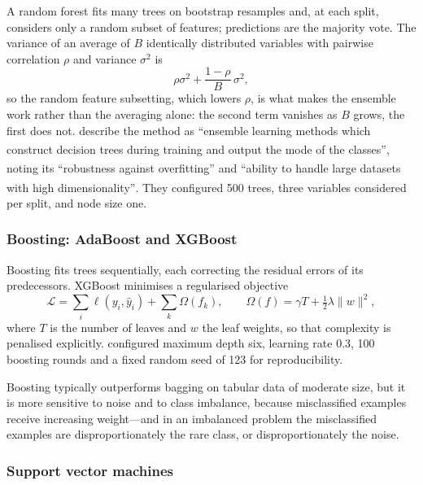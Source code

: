 \documentclass[12pt,a4paper,oneside]{report}
\newcommand{\bq}[1]{``#1''\textsuperscript{\dag}}
\begin{document}
A random forest fits many trees on bootstrap resamples and, at each split, considers only a random subset of features; predictions are the majority vote. The variance of an average of $B$ identically distributed variables with pairwise correlation $\rho$ and variance $\sigma^2$ is
\begin{equation}
  \rho\sigma^2 + \frac{1-\rho}{B}\,\sigma^2,
\end{equation}
so the random feature subsetting, which lowers $\rho$, is what makes the ensemble work rather than the averaging alone: the second term vanishes as $B$ grows, the first does not. \Textcite{mendoza2025} describe the method as \bq{ensemble learning methods which construct decision trees during training and output the mode of the classes}, noting its \bq{robustness against overfitting} and \bq{ability to handle large datasets with high dimensionality}. They configured 500 trees, three variables considered per split, and node size one.

\subsubsection{Boosting: AdaBoost and XGBoost}

Boosting fits trees sequentially, each correcting the residual errors of its predecessors. XGBoost minimises a regularised objective
\begin{equation}
  \mathcal{L} = \sum_i \ell(y_i, \hat{y}_i) + \sum_k \Omega(f_k),
  \qquad \Omega(f) = \gamma T + \tfrac{1}{2}\lambda\lVert w \rVert^2,
\end{equation}
where $T$ is the number of leaves and $w$ the leaf weights, so that complexity is penalised explicitly. \Textcite{mendoza2025} configured maximum depth six, learning rate 0.3, 100 boosting rounds and a fixed random seed of 123 for reproducibility.

Boosting typically outperforms bagging on tabular data of moderate size, but it is more sensitive to noise and to class imbalance, because misclassified examples receive increasing weight---and in an imbalanced problem the misclassified examples are disproportionately the rare class, or disproportionately the noise.

\subsubsection{Support vector machines}
\end{document}
